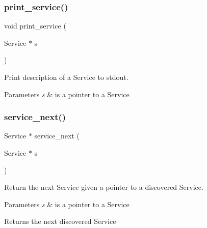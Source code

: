 \subsubsection{\texorpdfstring{print\+\_\+service()}{print\_service()}}
{\footnotesize\ttfamily void print\+\_\+service (\begin{DoxyParamCaption}\item[{Service $\ast$}]{s }\end{DoxyParamCaption})}



Print description of a Service to stdout. 


\begin{DoxyParams}{Parameters}
{\em s} & is a pointer to a Service \\
\hline
\end{DoxyParams}
\mbox{\label{group__dnssd__client_ga18c057a6f1be1a5916c765a4f344f1ea}} 
\subsubsection{\texorpdfstring{service\+\_\+next()}{service\_next()}}
{\footnotesize\ttfamily Service $\ast$ service\+\_\+next (\begin{DoxyParamCaption}\item[{Service $\ast$}]{s }\end{DoxyParamCaption})}



Return the next Service given a pointer to a discovered Service. 


\begin{DoxyParams}{Parameters}
{\em s} & is a pointer to a Service \\
\hline
\end{DoxyParams}
\begin{DoxyReturn}{Returns}
the next discovered Service 
\end{DoxyReturn}

